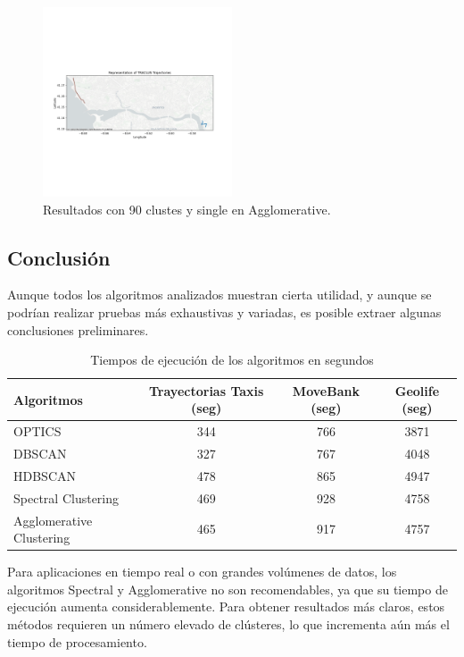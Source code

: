 \begin{figure}[h!]
    \centering
    \includegraphics[width=0.5\textwidth]{img/Taxis/map_agglo_par.png}
    \caption{Resultados con 90 clustes y single en Agglomerative.}
    \label{fig:agglo_par}
\end{figure}

\subsection{Conclusión}

Aunque todos los algoritmos analizados muestran cierta utilidad, y aunque se podrían realizar pruebas más exhaustivas y variadas, es posible extraer algunas conclusiones preliminares.

\begin{table}[ht]
\centering
\begin{tabular}{|l|c|c|c|}
\hline
\textbf{Algoritmos} & \textbf{Trayectorias Taxis (seg)} & \textbf{MoveBank (seg)} & \textbf{Geolife (seg)}  \\
\hline
OPTICS & 344 & 766 & 3871 \\
DBSCAN & 327 & 767 & 4048 \\
HDBSCAN & 478 & 865 & 4947 \\
Spectral Clustering & 469 & 928 & 4758 \\
Agglomerative Clustering & 465 & 917 & 4757 \\
\hline
\end{tabular}
\caption{Tiempos de ejecución de los algoritmos en segundos}
\label{tabla:comparacion_algoritmos}
\end{table}

Para aplicaciones en tiempo real o con grandes volúmenes de datos, los algoritmos Spectral y Agglomerative no son recomendables, ya que su tiempo de ejecución aumenta considerablemente. Para obtener resultados más claros, estos métodos requieren un número elevado de clústeres, lo que incrementa aún más el tiempo de procesamiento.

